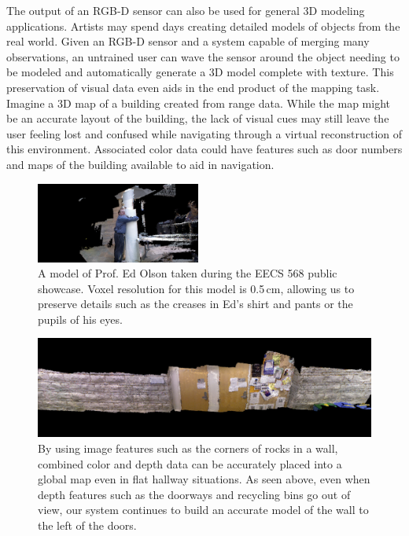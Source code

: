 \documentclass[letterpaper, 10pt, conference]{ieeeconf}
\begin{document}
The output of an RGB-D sensor can also be used for general 3D modeling
applications. Artists may spend days creating detailed models of objects from
the real world. Given an RGB-D sensor and a system capable of merging many
observations, an untrained user can wave the sensor around the object needing
to be modeled and automatically generate a 3D model complete with texture.
This preservation of visual data even aids in the end product of the mapping
task. Imagine a 3D map of a building created from range data. While the map
might be an accurate layout of the building, the lack of visual cues may still
leave the user feeling lost and confused while navigating through a virtual
reconstruction of this environment. Associated color data could
have features such as door numbers and maps of the building available to aid
in navigation.

\begin{figure}[t]
\centering
\includegraphics[width=0.48\textwidth]{figures/Ed_hugging_pole.png}
\caption{A model of Prof. Ed Olson taken during the EECS 568 public showcase.
Voxel resolution for this model is 0.5\,cm, allowing us to preserve details
such as the creases in Ed's shirt and pants or the pupils of his eyes.}
\label{fig:ed-model}
\end{figure}

\begin{figure}[t]
\centering
\includegraphics[width=.9\textwidth]{figures/CSE_Wall.png}
\caption{By using image features such as the corners of rocks in a wall,
combined color and depth data can be accurately placed into a global map even
in flat hallway situations. As seen above, even when depth features such as
the doorways and recycling bins go out of view, our system continues to build
an accurate model of the wall to the left of the doors.}
\label{fig:cse-wall}
\end{figure}
\end{document}
